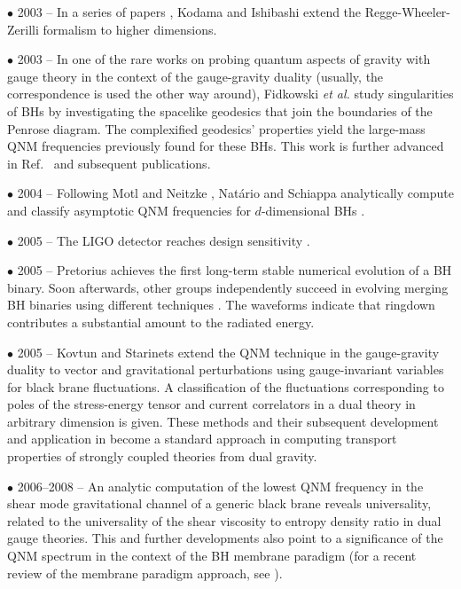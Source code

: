 \documentclass[]{iopart}
\begin{document}
\noindent $\bullet$ 2003 -- In a series of papers
\cite{Kodama:2003jz,Ishibashi:2003ap,Kodama:2003kk}, Kodama and Ishibashi
extend the Regge-Wheeler-Zerilli formalism to higher dimensions.

\noindent $\bullet$ 2003 -- In one of the rare works on probing quantum aspects
of gravity with gauge theory in the context of the gauge-gravity duality
(usually, the correspondence is used the other way around), Fidkowski {\it et
  al.} \cite{Fidkowski:2003nf} study singularities of BHs by investigating the
spacelike geodesics that join the boundaries of the Penrose diagram. The
complexified geodesics' properties yield the large-mass QNM frequencies
previously found for these BHs. This work is further advanced in
Ref.~\cite{Festuccia:2005pi} and subsequent publications.

\noindent $\bullet$ 2004 -- Following Motl and Neitzke \cite{Motl:2003cd},
Nat\'ario and Schiappa analytically compute and classify asymptotic QNM
frequencies for $d$-dimensional BHs \cite{Natario:2004jd}.

\noindent $\bullet$ 2005 -- The LIGO detector reaches design sensitivity
\cite{:2007kva}.

\noindent $\bullet$ 2005 -- Pretorius \cite{Pretorius:2005gq} achieves the
first long-term stable numerical evolution of a BH binary. Soon afterwards,
other groups independently succeed in evolving merging BH binaries using
different techniques \cite{Campanelli:2005dd,Baker:2005vv}. The waveforms
indicate that ringdown contributes a substantial amount to the radiated
energy.

\noindent $\bullet$ 2005 -- Kovtun and Starinets \cite{Kovtun:2005ev} extend
the QNM technique in the gauge-gravity duality to vector and gravitational
perturbations using gauge-invariant variables for black brane fluctuations. A
classification of the fluctuations corresponding to poles of the stress-energy
tensor and current correlators in a dual theory in arbitrary dimension is
given.  These methods and their subsequent development and application in
\cite{Parnachev:2005hh,Benincasa:2005iv,Buchel:2005cv,Benincasa:2005qc} become
a standard approach in computing transport properties of strongly coupled
theories from dual gravity.

\noindent $\bullet$ 2006--2008 -- An analytic computation of the lowest QNM
frequency in the shear mode gravitational channel of a generic black brane
\cite{Starinets:2008fb} reveals universality, related to the universality of
the shear viscosity to entropy density ratio in dual gauge theories. This and
further developments \cite{Iqbal:2008by,Bhattacharyya:2008jc} also point to a
significance of the QNM spectrum in the context of the BH membrane paradigm
(for a recent review of the membrane paradigm approach, see
\cite{Damour:2008ji}).
\end{document}
